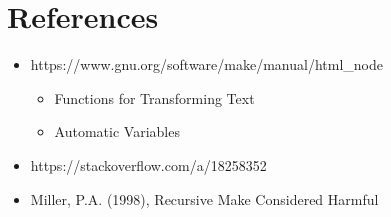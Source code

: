 \section{References}

\begin{frame}{\secname}
    \small
    \begin{itemize}
        \item https://www.gnu.org/software/make/manual/html\_node
        \begin{itemize}
            \item Functions for Transforming Text
            \item Automatic Variables
        \end{itemize}
        \item https://stackoverflow.com/a/18258352
        \item Miller, P.A. (1998), Recursive Make Considered Harmful
    \end{itemize}
    \normalsize
\end{frame}
